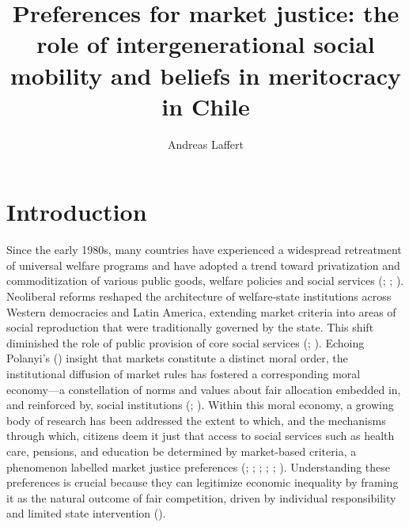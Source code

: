 \documentclass[
  12pt,
]{article}
\title{Preferences for market justice: the role of intergenerational
social mobility and beliefs in meritocracy in Chile}
\author{Andreas Laffert}
\affil{%
                  Instituto de Sociología, Pontificia Universidad
                  Católica de Chile
              }
\date{}
\begin{document}
\maketitle

\section{Introduction}\label{introduction}

Since the early 1980s, many countries have experienced a widespread
retreatment of universal welfare programs and have adopted a trend
toward privatization and commoditization of various public goods,
welfare policies and social services
(;
;
). Neoliberal reforms
reshaped the architecture of welfare-state institutions across Western
democracies and Latin America, extending market criteria into areas of
social reproduction that were traditionally governed by the state. This
shift diminished the role of public provision of core social services
(;
).
Echoing Polanyi's () insight that
markets constitute a distinct moral order, the institutional diffusion
of market rules has fostered a corresponding moral economy---a
constellation of norms and values about fair allocation embedded in, and
reinforced by, social institutions (; ).
Within this moral economy, a growing body of research has been addressed
the extent to which, and the mechanisms through which, citizens deem it
just that access to social services such as health care, pensions, and
education be determined by market-based criteria, a phenomenon labelled
market justice preferences
(;
;
;
;
;
).
Understanding these preferences is crucial because they can legitimize
economic inequality by framing it as the natural outcome of fair
competition, driven by individual responsibility and limited state
intervention ().
\end{document}
